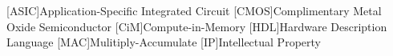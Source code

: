 \begin{acronym}
    [ASIC]{Application-Specific Integrated Circuit}
    [CMOS]{Complimentary Metal Oxide Semiconductor}
    [CiM]{Compute-in-Memory}
    [HDL]{Hardware Description Language}
    [MAC]{Mulitiply-Accumulate}
    [IP]{Intellectual Property}
\end{acronym}